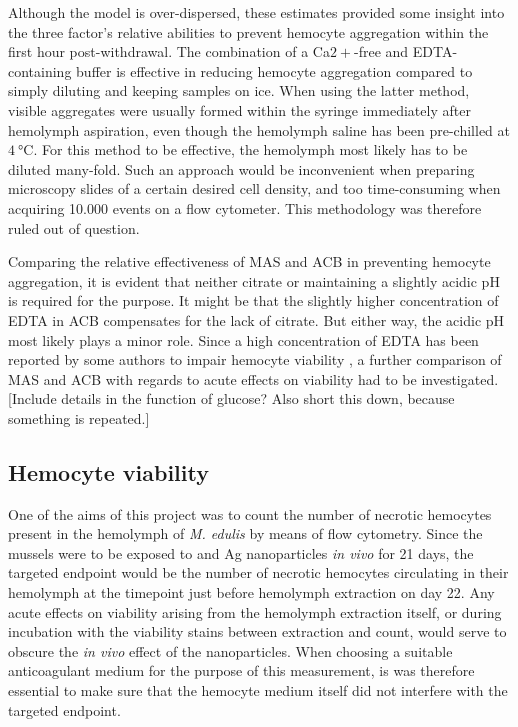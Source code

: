 Although the model is over-dispersed, these estimates provided some insight into the three factor's relative abilities to prevent hemocyte aggregation within the first hour post-withdrawal. The combination of a Ca${2+}$-free and EDTA-containing buffer is effective in reducing hemocyte aggregation compared to simply diluting and keeping samples on ice. When using the latter method, visible aggregates were usually formed within the syringe immediately after hemolymph aspiration, even though the hemolymph saline has been pre-chilled at $\SI{4}{\celsius}$. For this method to be effective, the hemolymph most likely has to be diluted many-fold. Such an approach would be inconvenient when preparing microscopy slides of a certain desired cell density, and too time-consuming when acquiring 10.000 events on a flow cytometer. This methodology was therefore ruled out of question.

Comparing the relative effectiveness of MAS and ACB in preventing hemocyte aggregation, it is evident that neither citrate or maintaining a slightly acidic pH is required for the purpose. It might be that the slightly higher concentration of EDTA in ACB compensates for the lack of citrate. But either way, the acidic pH most likely plays a minor role. Since a high concentration of EDTA has been reported by some authors to impair hemocyte viability \cite{Grandiosa2018, Burkhard2009}, a further comparison of MAS and ACB with regards to acute effects on viability had to be investigated. [Include details in the function of glucose? Also short this down, because something is repeated.]

\subsection{Hemocyte viability}
One of the aims of this project was to count the number of necrotic hemocytes present in the hemolymph of \emph{M. edulis} by means of flow cytometry. Since the mussels were to be exposed to  and Ag nanoparticles \emph{in vivo} for 21 days, the targeted endpoint would be the number of necrotic hemocytes circulating in their hemolymph at the timepoint just before hemolymph extraction on day 22. Any acute effects on viability arising from the hemolymph extraction itself, or during incubation with the viability stains between extraction and count, would serve to obscure the \emph{in vivo} effect of the nanoparticles. When choosing a suitable anticoagulant medium for the purpose of this measurement, is was therefore essential to make sure that the hemocyte medium itself did not interfere with the targeted endpoint.

